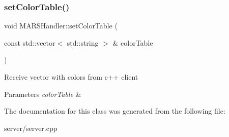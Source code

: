 \subsubsection{\texorpdfstring{set\+Color\+Table()}{setColorTable()}}
{\footnotesize\ttfamily void M\+A\+R\+S\+Handler\+::set\+Color\+Table (\begin{DoxyParamCaption}\item[{const std\+::vector$<$ std\+::string $>$ \&}]{color\+Table }\end{DoxyParamCaption})\hspace{0.3cm}{\ttfamily [inline]}}

Receive vector with colors from c++ client 
\begin{DoxyParams}{Parameters}
{\em color\+Table} & \\
\hline
\end{DoxyParams}


The documentation for this class was generated from the following file\+:\begin{DoxyCompactItemize}
\item 
server/server.\+cpp\end{DoxyCompactItemize}
